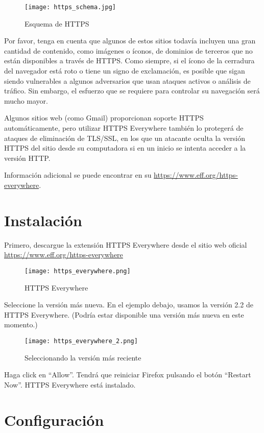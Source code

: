 \documentclass[10pt,a5paper,twoside,,]{book}
\begin{document}
\begin{figure}[htbp]
\centering
\texttt{[image: https\_schema.jpg]}
\caption{Esquema de HTTPS}
\end{figure}

Por favor, tenga en cuenta que algunos de estos sitios todavía incluyen
una gran cantidad de contenido, como imágenes o íconos, de dominios de
terceros que no están disponibles a través de HTTPS. Como siempre, si el
ícono de la cerradura del navegador está roto o tiene un signo de
exclamación, es posible que sigan siendo vulnerables a algunos
adversarios que usan ataques activos o análisis de tráfico. Sin embargo,
el esfuerzo que se requiere para controlar su navegación será mucho
mayor.

Algunos sitios web (como Gmail) proporcionan soporte HTTPS
automáticamente, pero utilizar HTTPS Everywhere también lo protegerá de
ataques de eliminación de TLS/SSL, en los que un atacante oculta la
versión HTTPS del sitio desde su computadora si en un inicio se intenta
acceder a la versión HTTP.

Información adicional se puede encontrar en su
\url{https://www.eff.org/https-everywhere}.

\section{Instalación}\label{instalaciuxf3n}

Primero, descargue la extensión HTTPS Everywhere desde el sitio web
oficial \url{https://www.eff.org/https-everywhere}

\begin{figure}[htbp]
\centering
\texttt{[image: https\_everywhere.png]}
\caption{HTTPS Everywhere}
\end{figure}

Seleccione la versión más nueva. En el ejemplo debajo, usamos la versión
2.2 de HTTPS Everywhere. (Podría estar disponible una versión más nueva
en este momento.)

\begin{figure}[htbp]
\centering
\texttt{[image: https\_everywhere\_2.png]}
\caption{Seleccionando la versión más reciente}
\end{figure}

Haga click en ``Allow''. Tendrá que reiniciar Firefox pulsando el botón
``Restart Now''. HTTPS Everywhere está instalado.

\section{Configuración}\label{configuraciuxf3n}
\end{document}
